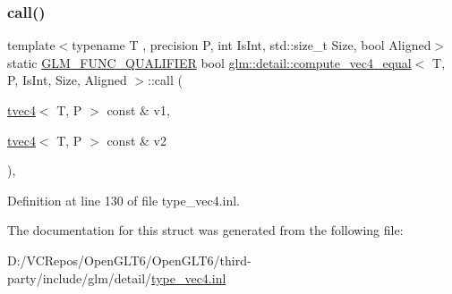 \subsubsection{\texorpdfstring{call()}{call()}}
{\footnotesize\ttfamily template$<$typename T , precision P, int Is\+Int, std\+::size\+\_\+t Size, bool Aligned$>$ \\
static \mbox{\hyperlink{setup_8hpp_a33fdea6f91c5f834105f7415e2a64407}{G\+L\+M\+\_\+\+F\+U\+N\+C\+\_\+\+Q\+U\+A\+L\+I\+F\+I\+ER}} bool \mbox{\hyperlink{structglm_1_1detail_1_1compute__vec4__equal}{glm\+::detail\+::compute\+\_\+vec4\+\_\+equal}}$<$ T, P, Is\+Int, Size, Aligned $>$\+::call (\begin{DoxyParamCaption}\item[{\mbox{\hyperlink{structglm_1_1tvec4}{tvec4}}$<$ T, P $>$ const \&}]{v1,  }\item[{\mbox{\hyperlink{structglm_1_1tvec4}{tvec4}}$<$ T, P $>$ const \&}]{v2 }\end{DoxyParamCaption})\hspace{0.3cm}{\ttfamily [inline]}, {\ttfamily [static]}}



Definition at line 130 of file type\+\_\+vec4.\+inl.



The documentation for this struct was generated from the following file\+:\begin{DoxyCompactItemize}
\item 
D\+:/\+V\+C\+Repos/\+Open\+G\+L\+T6/\+Open\+G\+L\+T6/third-\/party/include/glm/detail/\mbox{\hyperlink{type__vec4_8inl}{type\+\_\+vec4.\+inl}}\end{DoxyCompactItemize}
